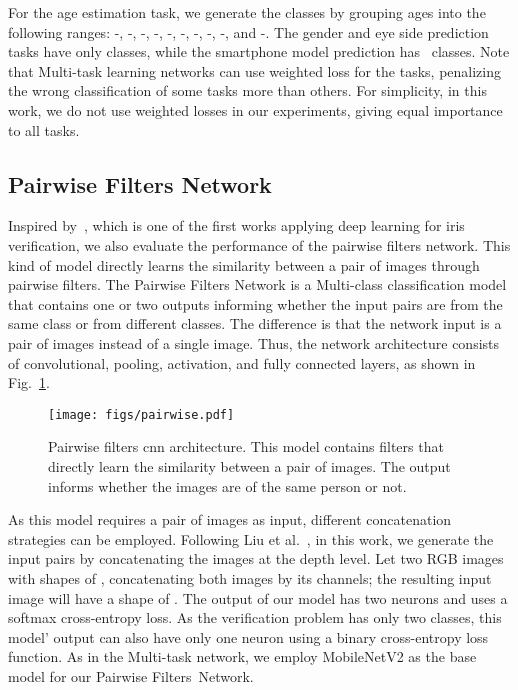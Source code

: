 \documentclass[journal]{IEEEtran}
\begin{document}
For the age estimation task, we generate the classes by grouping ages into the following  ranges: -, -, -, -, -, -, -, -, -, and -.
The gender and eye side prediction tasks have only  classes, while the smartphone model prediction has ~classes.
Note that Multi-task learning networks can use weighted loss for the tasks, penalizing the wrong classification of some tasks more than others.
For simplicity, in this work, we do not use weighted losses in our experiments, giving equal importance to all tasks.

\subsection{Pairwise Filters Network}
\label{sec:pairwise}

Inspired by~\cite{liu2016deepiris}, which is one of the first works applying deep learning for iris verification, we also evaluate the performance of the pairwise filters network.
This kind of model directly learns the similarity between a pair of images through pairwise filters.
The Pairwise Filters Network is a Multi-class classification model that contains one or two outputs informing whether the input pairs are from the same class or from different classes.
The difference is that the network input is a pair of images instead of a single image.
Thus, the network architecture consists of convolutional, pooling, activation, and fully connected layers, as shown in Fig.~\ref{fig:pairwise}.


\begin{figure}[!ht]
\centering

   	\texttt{[image: figs/pairwise.pdf]}

\vspace{-0.5mm}

\caption{Pairwise filters \gls{cnn} architecture. This model contains filters that directly learn the similarity between a pair of images. The output informs whether the images are of the same person or not.}
\label{fig:pairwise}
\end{figure}

As this model requires a pair of images as input, different concatenation strategies can be employed.
Following Liu et al.~\cite{liu2016deepiris}, in this work, we generate the input pairs by concatenating the images at the depth level.
Let two RGB images with shapes of , concatenating both images by its channels; the resulting input image will have a shape of .
The output of our model has two neurons and uses a softmax cross-entropy loss.
As the verification problem has only two classes, this model' output can also have only one neuron using a binary cross-entropy loss function.
As in the Multi-task network, we employ MobileNetV2 as the base model for our Pairwise Filters~Network. 
\end{document}
